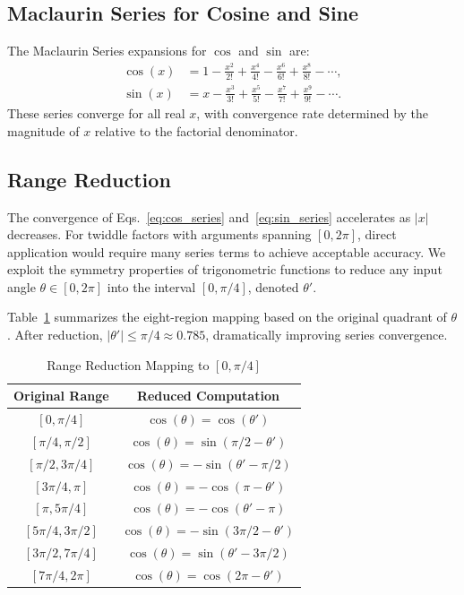 \documentclass[conference]{IEEEtran}
\begin{document}
\subsection{Maclaurin Series for Cosine and Sine}

The Maclaurin Series expansions for $\cos$ and $\sin$ are:
\begin{align}
\cos(x) &= 1 - \frac{x^2}{2!} + \frac{x^4}{4!} - \frac{x^6}{6!} + \frac{x^8}{8!} - \cdots, \label{eq:cos_series}\\
\sin(x) &= x - \frac{x^3}{3!} + \frac{x^5}{5!} - \frac{x^7}{7!} + \frac{x^9}{9!} - \cdots. \label{eq:sin_series}
\end{align}
These series converge for all real $x$, with convergence rate determined by the
magnitude of $x$ relative to the factorial denominator.

\subsection{Range Reduction}

The convergence of Eqs.~\eqref{eq:cos_series} and~\eqref{eq:sin_series}
accelerates as $|x|$ decreases. For twiddle factors with arguments spanning $[0,
2\pi]$, direct application would require many series terms to achieve acceptable
accuracy. We exploit the symmetry properties of trigonometric functions to
reduce any input angle $\theta \in [0, 2\pi]$ into the interval $[0, \pi/4]$,
denoted $\theta'$.

Table~\ref{tab:rangereduction} summarizes the eight-region mapping based on the
original quadrant of $\theta$. After reduction, $|\theta'| \leq \pi/4 \approx
0.785$, dramatically improving series convergence.

\begin{table}[!h]
\caption{Range Reduction Mapping to $[0, \pi/4]$}
\label{tab:rangereduction}
\centering
\renewcommand{\arraystretch}{1.3}
\begin{tabular}{c|c}
\toprule
\textbf{Original Range} & \textbf{Reduced Computation} \\
\midrule
$[0, \pi/4]$ & $\cos(\theta) = \cos(\theta')$ \\
$[\pi/4, \pi/2]$ & $\cos(\theta) = \sin(\pi/2 - \theta')$ \\
$[\pi/2, 3\pi/4]$ & $\cos(\theta) = -\sin(\theta' - \pi/2)$ \\
$[3\pi/4, \pi]$ & $\cos(\theta) = -\cos(\pi - \theta')$ \\
$[\pi, 5\pi/4]$ & $\cos(\theta) = -\cos(\theta' - \pi)$ \\
$[5\pi/4, 3\pi/2]$ & $\cos(\theta) = -\sin(3\pi/2 - \theta')$ \\
$[3\pi/2, 7\pi/4]$ & $\cos(\theta) = \sin(\theta' - 3\pi/2)$ \\
$[7\pi/4, 2\pi]$ & $\cos(\theta) = \cos(2\pi - \theta')$ \\
\bottomrule
\end{tabular}
\end{table}
\end{document}

